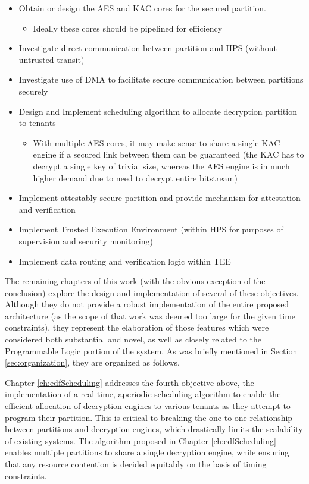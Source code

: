 \begin{itemize}
  \item Obtain or design the AES and KAC cores for the secured partition.
    \begin{itemize}  
      \item Ideally these cores should be pipelined for efficiency
    \end{itemize}
  \item Investigate direct communication between partition and HPS (without untrusted transit)
  \item Investigate use of DMA to facilitate secure communication between partitions securely
  \item Design and Implement scheduling algorithm to allocate decryption partition to tenants
    \begin{itemize}
      \item With multiple AES cores, it may make sense to share a single KAC engine if a secured link between them can be guaranteed (the KAC has to decrypt a single key of trivial size, whereas the AES engine is in much higher demand due to need to decrypt entire bitstream)
    \end{itemize}
  \item Implement attestably secure partition and provide mechanism for attestation and verification
  \item Implement Trusted Execution Environment (within HPS for purposes of supervision and security monitoring)
  \item Implement data routing and verification logic within TEE
  \end{itemize}

The remaining chapters of this work (with the obvious exception of the conclusion) explore the design and implementation of several of these objectives. Although they do not provide a robust implementation of the entire proposed architecture (as the scope of that work was deemed too large for the given time constraints), they represent the elaboration of those features which were considered both substantial and novel, as well as closely related to the Programmable Logic portion of the system. As was briefly mentioned in Section \ref{sec:organization}, they are organized as follows.

Chapter \ref{ch:edfScheduling} addresses the fourth objective above, the implementation of a real-time, aperiodic scheduling algorithm to enable the efficient allocation of decryption engines to various tenants as they attempt to program their partition. This is critical to breaking the one to one relationship between partitions and decryption engines, which drastically limits the scalability of existing systems. The algorithm proposed in Chapter \ref{ch:edfScheduling} enables multiple partitions to share a single decryption engine, while ensuring that any resource contention is decided equitably on the basis of timing constraints.

